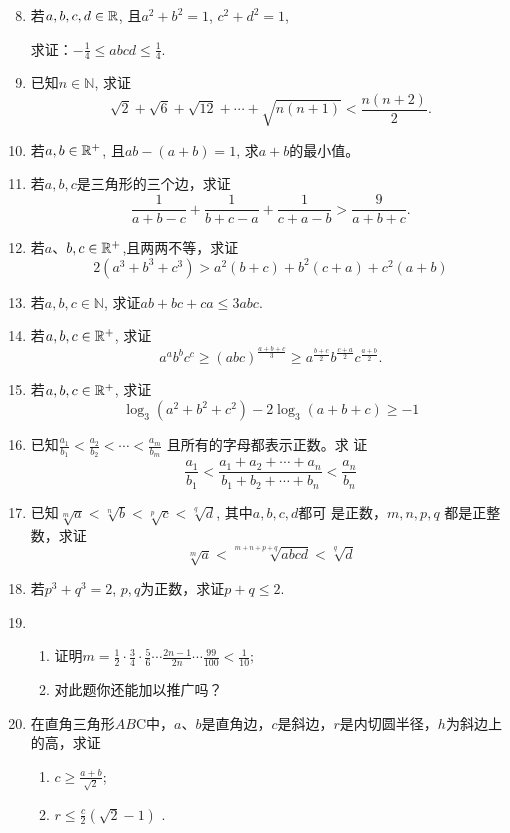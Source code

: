 \begin{enumerate}\setcounter{enumi}{7}
    \item 若$a,b,c,d\in \mathbb{R}$, 且$a^{2}+b^{2}=1$, $c^{2}+d^{2}=1$,
    
求证：$-\frac14\leq abcd\leqslant\frac14$.

\item 已知$n\in\mathbb{N}$, 求证
$$\sqrt{2}+\sqrt{6}+\sqrt{12}+\cdots+\sqrt{n(n+1)}<\frac{n(n+2)}{2}.$$
\item 若$a,b\in \mathbb{R}^+$, 且$ab-(a+b)=1$,
求$a+b$的最小值。

\item 若$a,b,c$是三角形的三个边，求证
$$\frac1{a+b-c}+\frac1{b+c-a}+\frac1{c+a-b}>\frac9{a+b+c}.$$
\item 若$a$、$b,c\in \mathbb{R}^+$,且两两不等，求证
$$2(a^3+b^3+c^3)>a^2(b+c)+b^2(c+a)+c^2(a+b) $$
\item 若$a,b,c\in\mathbb{N}$, 求证$ab+bc+ca\leqslant3abc.$

\item 若$a,b,c\in \mathbb{R}^+$, 求证
$$a^ab^bc^c\geqslant(abc)^{\tfrac{a+b+c}3}\geqslant a^{\tfrac{b+c}2}b^{\tfrac{c+a}2}c^{\tfrac{a+b}2}.$$
\item 若$a,b,c\in \mathbb{R}^+$, 求证
$$\log_3(a^2+b^2+c^2)-2\log_3(a+b+c)\geqslant-1 $$
\item 已知$\frac{a_{1}}{b_{1}}<\frac{a_{2}}{b_{2}}<\cdots<\frac{a_{m}}{b_{m}}$ 且所有的字母都表示正数。求
证
$$\frac{a_1}{b_1}<\frac{a_1+a_2+\cdots+a_n}{b_1+b_2+\cdots+b_n}<\frac{a_n}{b_n}$$
\item 已知$\sqrt[m]{a}<\sqrt[n]{b}<\sqrt[p]{c}<\sqrt[q]{d}$, 其中$a,b,c,d$都可
是正数，$m,n, p,q$ 都是正整数，求证
$$\sqrt[m]{a}<\sqrt[{m+n+p+q}]{abcd}<\sqrt[q]{d}$$
\item 若$p^3+q^3=2$, $p,q$为正数，求证$p+q\leqslant2$.
\item \begin{enumerate}[(1)]
\item 证明$m=\frac12 \cdot \frac34\cdot \frac56\cdots\frac{2n-1}{2n}\cdots \frac{99}{100}<\frac1{10};$
\item 对此题你还能加以推广吗？
\end{enumerate}

\item 在直角三角形$AB$C中，$a$、$b$是直角边，$c$是斜边，$r$是内切圆半径，$h$为斜边上的高，求证
\begin{multicols}{2}
\begin{enumerate}[(1)]
    \item $c\geqslant \frac {a+ b}{\sqrt {2}}$;
    \item  $r\leqslant \frac c2 ( \sqrt {2}- 1 )$ .
\end{enumerate}    
\end{multicols}

\end{enumerate}

